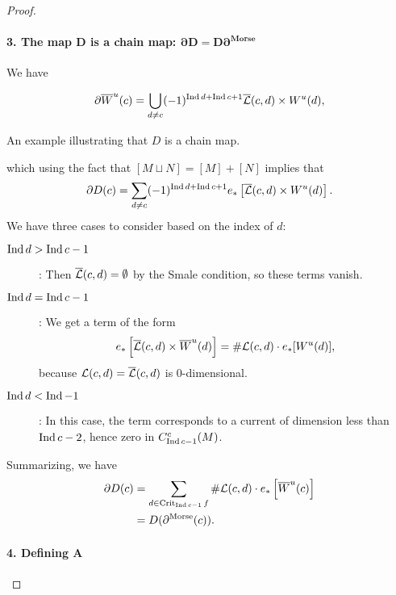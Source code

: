 \begin{proof}
    \paragraph{3. The map $\bm{D}$ is a chain map:  $\bm{\partial D = D \partial^{\text{Morse}}}$ }
    We have

    \[
        \partial \overline{W}^u(c) = \bigcup_{d \neq c}  (-1)^{\operatorname{Ind} d + \operatorname{Ind} c + 1} \overline{\mathcal L}(c, d) \times  W^u(d),
    \]
    \begin{marginfigure}
        \centering
        \caption{An example illustrating that $D$ is a chain map.}
        \label{fig:d-is-a-chain-map}
    \end{marginfigure}
    which using the fact that $[M \sqcup N] = [M] + [N]$ implies that
    \[
        \partial D(c) = \sum_{d \neq c} (-1)^{\operatorname{Ind} d + \operatorname{Ind} c + 1} e_*\left[\overline{\mathcal L}(c, d) \times  W^u(d)\right]
    .\] 
    We have three cases to consider based on the index of $d$:
    \begin{description}
        \item[$\operatorname{Ind} d > \operatorname{Ind} c-1$]: Then $\overline{\mathcal L}(c, d) = \emptyset$ by the Smale condition, so these terms vanish.
        \item[$\operatorname{Ind} d = \operatorname{Ind} c-1$]: We get a term of the form \[
            e_* \left[\overline{\mathcal L}(c, d) \times \overline{W}^u(d)\right] = \# \mathcal L(c, d) \cdot e_*[W^u(d)],\]
            because $\mathcal L(c, d) = \overline{\mathcal L}(c, d)$ is  $0$-dimensional.
        \item[$\operatorname{Ind} d < \operatorname{Ind} -1$]: In this case, the term corresponds to a current of dimension less than $\operatorname{Ind} c - 2$, hence zero in $C_{\operatorname{Ind} c - 1}^{c}(M)$.
    \end{description}
    Summarizing, we have
    \begin{align*}
        \partial D(c) &= \sum_{d \in \operatorname{Crit}_{\operatorname{Ind} c - 1} f} \# \mathcal L(c, d) \cdot e_* \left[ \overline{W}^u(c) \right] \\
                      &= D(\partial^{\text{Morse}}(c))
    .\end{align*} 

    \paragraph{4. Defining $\bm{A}$}


\end{proof}
